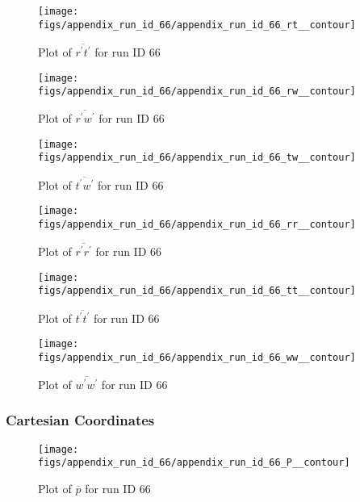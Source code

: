 \begin{figure}[H]
\centering
\texttt{[image: figs/appendix\_run\_id\_66/appendix\_run\_id\_66\_rt\_\_contour]}
\caption{Plot of $\overline{r^\prime t^\prime}$ for run ID 66}
\label{fig:appendix_run_id_66_rt__contour}
\end{figure}


\begin{figure}[H]
\centering
\texttt{[image: figs/appendix\_run\_id\_66/appendix\_run\_id\_66\_rw\_\_contour]}
\caption{Plot of $\overline{r^\prime w^\prime}$ for run ID 66}
\label{fig:appendix_run_id_66_rw__contour}
\end{figure}


\begin{figure}[H]
\centering
\texttt{[image: figs/appendix\_run\_id\_66/appendix\_run\_id\_66\_tw\_\_contour]}
\caption{Plot of $\overline{t^\prime w^\prime}$ for run ID 66}
\label{fig:appendix_run_id_66_tw__contour}
\end{figure}


\begin{figure}[H]
\centering
\texttt{[image: figs/appendix\_run\_id\_66/appendix\_run\_id\_66\_rr\_\_contour]}
\caption{Plot of $\overline{r^\prime r^\prime}$ for run ID 66}
\label{fig:appendix_run_id_66_rr__contour}
\end{figure}


\begin{figure}[H]
\centering
\texttt{[image: figs/appendix\_run\_id\_66/appendix\_run\_id\_66\_tt\_\_contour]}
\caption{Plot of $\overline{t^\prime t^\prime}$ for run ID 66}
\label{fig:appendix_run_id_66_tt__contour}
\end{figure}


\begin{figure}[H]
\centering
\texttt{[image: figs/appendix\_run\_id\_66/appendix\_run\_id\_66\_ww\_\_contour]}
\caption{Plot of $\overline{w^\prime w^\prime}$ for run ID 66}
\label{fig:appendix_run_id_66_ww__contour}
\end{figure}


\subsubsection{Cartesian Coordinates}
\begin{figure}[H]
\centering
\texttt{[image: figs/appendix\_run\_id\_66/appendix\_run\_id\_66\_P\_\_contour]}
\caption{Plot of $\overline{p}$ for run ID 66}
\label{fig:appendix_run_id_66_P__contour}
\end{figure}



